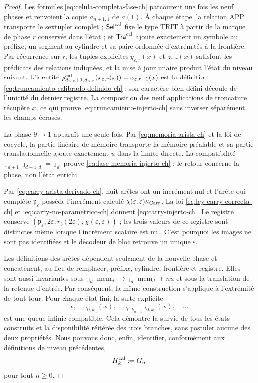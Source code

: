 \begin{proof}
Les formules \eqref{eq:celula-completa-fase-ch} parcourent une fois les neuf phases et renvoient la copie \(a_{n+1,1}\) de \(a(1)\). À chaque étape, la relation APP transporte le sextuplet complet ; \(\mathsf{Sel}^{\rm cal}\) fixe le type TRIT à partir de la marque de phase \(r\) conservée dans l'état ; et \(\mathsf{Tra}^{\rm cal}\) ajoute exactement un symbole au préfixe, un segment au cylindre et sa paire ordonnée d'extrémités à la frontière. Par récurrence sur \(r\), les tuples explicites \(y_{\varepsilon,r}(x)\) et \(z_{\varepsilon,r}(x)\) satisfont les prédicats des relations indiquées, et la mise à jour unaire produit l'état du niveau suivant. L'identité \(\rho^{\rm cal}_{d_{n,r}+1,d_{n,r}}
(x_{\varepsilon,r}(x))=x_{\varepsilon,r-1}(x)\) est la définition \eqref{eq:truncamiento-calibrado-definido-ch} ; son caractère bien défini découle de l'unicité du dernier registre. La composition des neuf applications de troncature récupère \(x\), ce qui prouve \eqref{eq:truncamiento-injerto-ch} sans inverser séparément les champs écrasés.

La phase \(9\to1\) apparaît une seule fois. Par
\eqref{eq:memoria-arista-ch} et la loi de cocycle, la partie linéaire de mémoire
transporte la mémoire préalable et sa partie translationnelle ajoute exactement \(u\)
dans la limite directe. La compatibilité
\(\jmath_{d+1}\jmath_{d+1,d}=\jmath_d\) prouve
\eqref{eq:fase-memoria-injerto-ch} ; le retour concerne la phase, non
l’état enrichi.

Par \eqref{eq:carry-arista-derivado-ch}, huit arêtes ont un incrément nul et
l’arête qui complète \(\mathfrak p_\varepsilon\) possède l’incrément calculé
\(\chi(\varepsilon,\varepsilon)\kappa_{\rm Carr}\). La loi
\eqref{eq:ley-carry-correcta-ch} et
\eqref{eq:carry-no-parametrico-ch} donnent
\eqref{eq:carry-injerto-ch}. Le registre conserve
\((\mathfrak p_\varepsilon,2\varepsilon,r_3(2\varepsilon),
\chi(\varepsilon,\varepsilon))\) ; les trois valeurs de ce registre sont
distinctes même lorsque l’incrément scalaire est nul. C’est pourquoi les images
ne sont pas identifiées et le décodeur de bloc retrouve un unique
\(\varepsilon\).

Les définitions des arêtes dépendent seulement de la nouvelle phase et concatènent,
au lieu de remplacer, préfixe, cylindre, frontière et registre. Elles sont aussi
invariantes sous
\(\jmath_d\operatorname{mem}_d\mapsto
  \jmath_d\operatorname{mem}_d+nu\)
et sous la translation de la retenue
d’entrée. Par conséquent, la même construction s’applique à l’extrémité de
tout tour. Pour chaque état fini, la suite explicite
\[
 x,\quad\gamma_{0,k_n}(x),\quad
 \gamma_{0,k_{n+1}}\gamma_{0,k_n}(x),\quad\ldots
\]
est une queue infinie compatible. Cela démontre la survie de tous les
états construits et la disponibilité réitérée des trois branches, sans
postuler aucune des deux propriétés. Nous pouvons donc, enfin,
identifier, conformément aux définitions de niveau précédentes,
\begin{equation}
 H_{k_n}^{\rm cal}:=G_n
 \label{eq:subarbol-calibrado-superviviente-ch}
\end{equation}
pour tout \(n\ge0\).
\end{proof}


